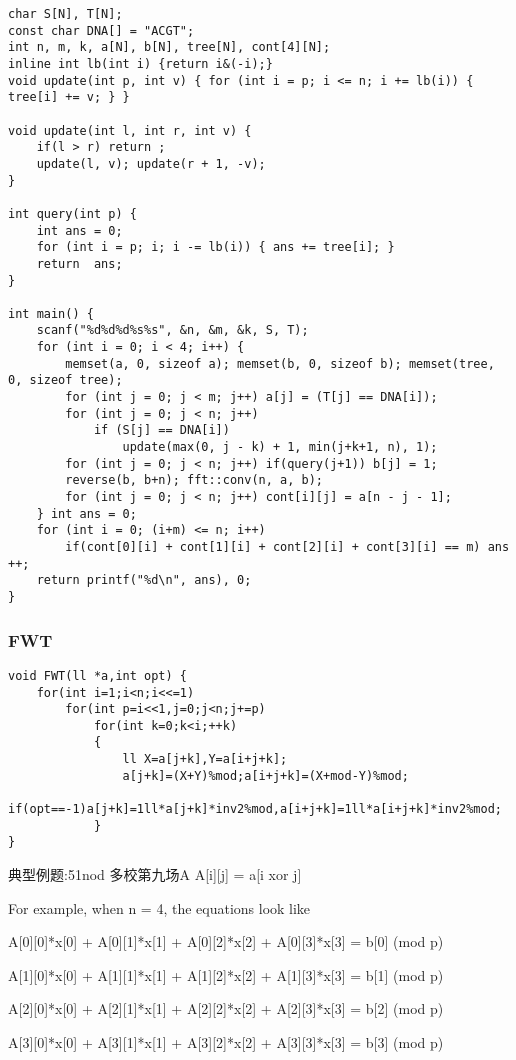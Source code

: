 \begin{lstlisting}
char S[N], T[N];
const char DNA[] = "ACGT";
int n, m, k, a[N], b[N], tree[N], cont[4][N];
inline int lb(int i) {return i&(-i);}
void update(int p, int v) { for (int i = p; i <= n; i += lb(i)) { tree[i] += v; } }

void update(int l, int r, int v) {
    if(l > r) return ;
    update(l, v); update(r + 1, -v);
}

int query(int p) {
    int ans = 0;
    for (int i = p; i; i -= lb(i)) { ans += tree[i]; } 
    return  ans;
}

int main() {
    scanf("%d%d%d%s%s", &n, &m, &k, S, T);
    for (int i = 0; i < 4; i++) {
        memset(a, 0, sizeof a); memset(b, 0, sizeof b); memset(tree, 0, sizeof tree);
        for (int j = 0; j < m; j++) a[j] = (T[j] == DNA[i]);
        for (int j = 0; j < n; j++) 
            if (S[j] == DNA[i])
                update(max(0, j - k) + 1, min(j+k+1, n), 1);
        for (int j = 0; j < n; j++) if(query(j+1)) b[j] = 1;
        reverse(b, b+n); fft::conv(n, a, b);
        for (int j = 0; j < n; j++) cont[i][j] = a[n - j - 1];
    } int ans = 0;
    for (int i = 0; (i+m) <= n; i++) 
        if(cont[0][i] + cont[1][i] + cont[2][i] + cont[3][i] == m) ans ++;
    return printf("%d\n", ans), 0;
}
\end{lstlisting}

\subsubsection{FWT}

\begin{lstlisting}
void FWT(ll *a,int opt) {
    for(int i=1;i<n;i<<=1)
        for(int p=i<<1,j=0;j<n;j+=p)
            for(int k=0;k<i;++k)
            {
                ll X=a[j+k],Y=a[i+j+k];
                a[j+k]=(X+Y)%mod;a[i+j+k]=(X+mod-Y)%mod;
                if(opt==-1)a[j+k]=1ll*a[j+k]*inv2%mod,a[i+j+k]=1ll*a[i+j+k]*inv2%mod;
            }
}
\end{lstlisting}

典型例题:51nod 多校第九场A
A[i][j] = a[i xor j]

For example, when n = 4, the equations look like

A[0][0]*x[0] + A[0][1]*x[1] + A[0][2]*x[2] + A[0][3]*x[3] = b[0] (mod p)

A[1][0]*x[0] + A[1][1]*x[1] + A[1][2]*x[2] + A[1][3]*x[3] = b[1] (mod p)

A[2][0]*x[0] + A[2][1]*x[1] + A[2][2]*x[2] + A[2][3]*x[3] = b[2] (mod p)

A[3][0]*x[0] + A[3][1]*x[1] + A[3][2]*x[2] + A[3][3]*x[3] = b[3] (mod p)

